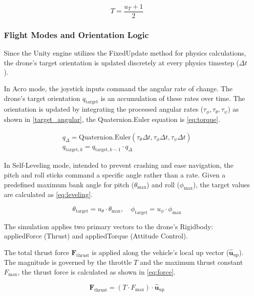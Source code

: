 \begin{equation}\label{eq:mappingt}
    T = \frac{u_T + 1}{2}
\end{equation}

\subsubsection{Flight Modes and Orientation Logic}

Since the Unity engine utilizes the FixedUpdate method for physics calculations, the drone's target orientation is updated discretely at every physics timestep ($\Delta t$).

In Acro mode, the joystick inputs command the angular rate of change. The drone's target orientation $q_{\text{target}}$ is an accumulation of these rates over time. The orientation is updated by integrating the processed angular rates ($\tau_\phi, \tau_\theta, \tau_\psi$) as shown in \cref{target_angular}, the Quaternion.Euler equation is \cref{eq:torque}.

\begin{equation}\label{target_angular}
\begin{gathered}
    q_{\Delta} = \text{Quaternion.Euler}(\tau_\theta \Delta t, \tau_\phi \Delta t, \tau_\psi \Delta t) \\
    q_{\text{target}, k} = q_{\text{target}, k-1} \cdot q_{\Delta}
\end{gathered}
\end{equation}

In Self-Leveling mode, intended to prevent crashing and ease navigation, the pitch and roll sticks command a specific angle rather than a rate. Given a predefined maximum bank angle for pitch ($\theta_{\max}$) and roll ($\phi_{\max}$), the target values are calculated as \cref{eq:leveling}.

\begin{equation}\label{eq:leveling}
  \theta_{\text{target}} = u_\theta \cdot \theta_{\max}, \quad \phi_{\text{target}} = u_\phi \cdot \phi_{\max}  
\end{equation}

The simulation applies two primary vectors to the drone's Rigidbody: appliedForce (Thrust) and appliedTorque (Attitude Control).

The total thrust force $\mathbf{F}_{\text{thrust}}$ is applied along the vehicle's local up vector ($\hat{\mathbf{u}}_{\text{up}}$). The magnitude is governed by the throttle $T$ and the maximum thrust constant $F_{\max}$, the thrust force is calculated as shown in \cref{eq:force}.

\begin{equation}\label{eq:force}
    \mathbf{F}_{\text{thrust}} = (T \cdot F_{\max}) \cdot \hat{\mathbf{u}}_{\text{up}}
\end{equation}
